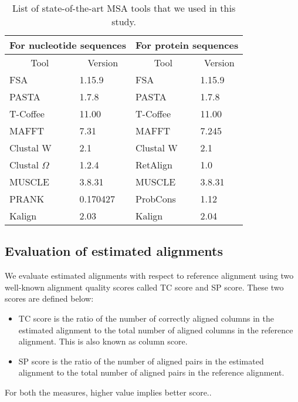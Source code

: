 \begin{table*}[htbp]
	\small
	\centering
	\caption{List of state-of-the-art MSA tools that we used in this study.}
	\begin{tabular}{|l|l||l|l|}
		\hline
		\multicolumn{2}{|c||}{For nucleotide sequences} & \multicolumn{2}{c|}{For protein sequences} \\
		\hline
		\multicolumn{1}{|c|}{Tool} & \multicolumn{1}{c||}{Version} & \multicolumn{1}{c|}{Tool} & \multicolumn{1}{c|}{Version} \\
		\hline
		FSA~\citep{bradley2009fast} & 1.15.9 & FSA   & 1.15.9 \\
		\hline
		PASTA~\citep{mirarab2015pasta} & 1.7.8 & PASTA & 1.7.8 \\
		\hline
		T-Coffee~\citep{notredame2000t} & 11.00 & T-Coffee & 11.00 \\
		\hline
		MAFFT~\citep{katoh2002mafft} & 7.31  & MAFFT & 7.245 \\
		\hline
		Clustal W~\citep{thompson1994clustal} & 2.1   & Clustal W & 2.1 \\
		\hline
		Clustal $ \Omega $~\citep{sievers2011fast} & 1.2.4 & RetAlign~\citep{szabo2010reticular} & 1.0 \\
		\hline
		MUSCLE~\citep{edgar2004muscle} & 3.8.31 & MUSCLE & 3.8.31 \\
		\hline
		PRANK~\citep{loytynoja2005algorithm} & 0.170427 & ProbCons~\citep{do2005probcons} & 1.12 \\
		\hline
		Kalign~\citep{lassmann2008kalign2} & 2.03  & Kalign & 2.04 \\
		\hline
	\end{tabular}%
	\label{tab:msa_tools}%
\end{table*}%



\subsection{Evaluation of estimated alignments}
We evaluate estimated alignments with respect to reference alignment using two well-known alignment quality scores called TC score and SP score. These two scores are defined below:
\begin{itemize}
	\item TC score is the ratio of the number of correctly aligned columns in the estimated alignment to the total number of aligned columns in the reference alignment. This is also known as column score.
	
	\item SP score is the ratio of the number of aligned pairs in the estimated alignment to the total number of aligned pairs in the reference alignment.
	
\end{itemize}
For both the measures, higher value implies better score..

